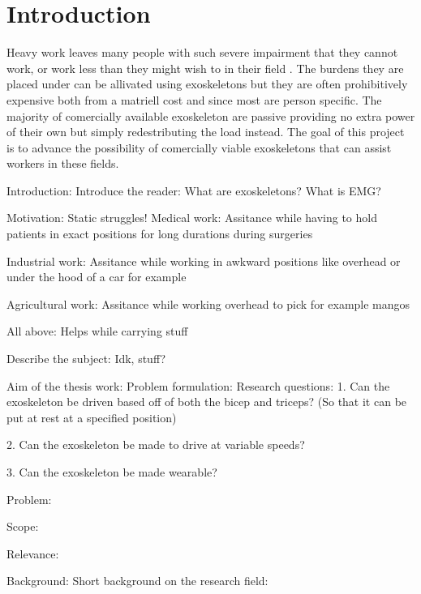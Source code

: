 \section{Introduction}
\label{section:intro}

Heavy work leaves many people with such severe impairment that they cannot work, or work less than they might wish to in their 
field \cite{workdemands}. The burdens they are placed under can be allivated using exoskeletons but they are often prohibitively 
expensive both from a matriell cost and since most are person specific. The majority of comercially available exoskeleton are 
passive providing no extra power of their own but simply redestributing the load instead. The goal of this project is to advance 
the possibility of comercially viable exoskeletons that can assist workers in these fields.

Introduction:
    Introduce the reader:
        What are exoskeletons?
        What is EMG?

    Motivation:
        Static struggles!
            Medical work:
                Assitance while having to hold patients in exact positions for long durations during surgeries

            Industrial work:
                Assitance while working in awkward positions like overhead or under the hood of a car for example

            Agricultural work:
                Assitance while working overhead to pick for example mangos
            
            All above:
                Helps while carrying stuff

    Describe the subject:
        Idk, stuff?

    Aim of the thesis work:
        Problem formulation: %
            Research questions:
                1.	Can the exoskeleton be driven based off of both the bicep and triceps? (So that it can be put at rest at a specified position)

                2.	Can the exoskeleton be made to drive at variable speeds?

                3.	Can the exoskeleton be made wearable?

            Problem:
                

            Scope:
            
            Relevance: %


Background: 
    Short background on the research field:

